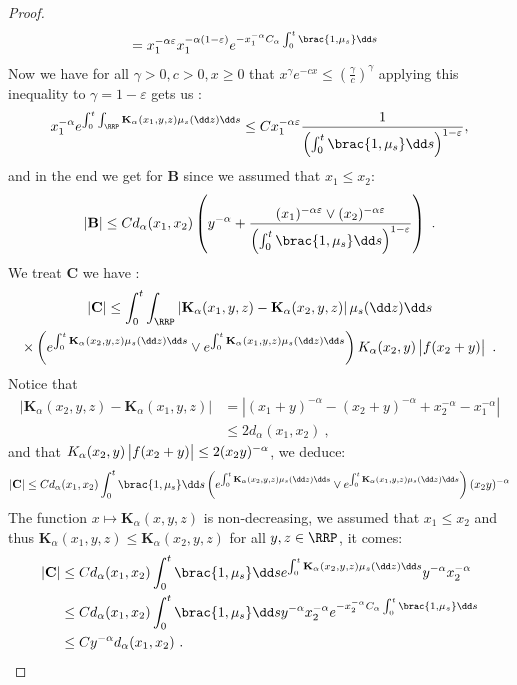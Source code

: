 \begin{proof}
\begin{align*}
        &=x_1^{-\alpha \varepsilon} x_1^{-\alpha(1-\varepsilon)}e^{-x_1^{-\alpha}C_\alpha\int_0^t\brac{1,\mu_s} \dd s} 
    \end{align*}
    Now we have for all $\gamma > 0, c> 0,x\geq 0$ that $x^{\gamma}e^{-cx} \leq \left(\frac{\gamma}{c}\right)^\gamma$ applying this inequality to $\gamma = 1 - \varepsilon $ gets us :
    \begin{align*}
        x_1^{-\alpha}e^{\int_0^t\int_{\RRP} \mathbf{K}_\alpha(x_1,y,z)\mu_s(\dd z) \dd s}   \leq C x_1^{-\alpha \varepsilon} \dfrac{1}{\left(\int_0^t\brac{1,\mu_s} \dd s\right)^{1 - \varepsilon}},
    \end{align*}
    and in the end we get for $\mathbf{B}$ since we assumed that $x_1 \leq x_2$:
    \begin{align*}
        |\mathbf{B}| \leq C d_\alpha(x_1,x_2) \left(y^{-\alpha} + \dfrac{(x_1)^{-\alpha \varepsilon} \vee (x_2)^{-\alpha \varepsilon}}{\left(\int_0^t\brac{1,\mu_s} \dd s\right)^{1 - \varepsilon}} \right)\ .
    \end{align*}
    We treat $\mathbf{C}$ we have :
    \begin{multline*}
        |\mathbf{C}|\leq \int_0^t\int_{\RRP} \left|\mathbf{K}_\alpha(x_1,y,z) - \mathbf{K}_\alpha(x_2,y,z) \right| \mu_s(\dd z) \dd s \\
        \times \left(e^{\int_0^t \mathbf{K}_\alpha(x_2,y,z) \mu_s(\dd z) \dd s} \vee e^{\int_0^t \mathbf{K}_\alpha(x_1,y,z) \mu_s(\dd z) \dd s}\right)K_\alpha(x_2,y)\left|\vphantom{A^2} f(x_2+y)\right|\ .
    \end{multline*}
    Notice that 
    \begin{align*}
        \left|\mathbf{K}_\alpha(x_2,y,z) - \mathbf{K}_\alpha(x_1,y,z)\right| &= \left|(x_1 + y)^{-\alpha} -  (x_2 + y)^{-\alpha} + x_2^{-\alpha} -x_1^{-\alpha}\right|\\
        &\leq 2d_\alpha(x_1,x_2)\ ,
    \end{align*}
    and that $K_\alpha(x_2,y)\left|\vphantom{A^2} f(x_2+y)\right|\leq 2(x_2y)^{-\alpha}$, we deduce:
    \begin{align*}
        |\mathbf{C}|\leq C d_\alpha(x_1,x_2)\int_0^t \brac{1,\mu_s} \dd s \left(e^{\int_0^t \mathbf{K}_\alpha(x_2,y,z) \mu_s(\dd z) \dd s} \vee e^{\int_0^t \mathbf{K}_\alpha(x_1,y,z) \mu_s(\dd z) \dd s}\right)(x_2y)^{-\alpha}
    \end{align*}
    The function $x\mapsto \mathbf{K}_\alpha(x,y,z)$ is non-decreasing, we assumed that $x_1 \leq  x_2$ and thus $\mathbf{K}_\alpha(x_1,y,z) \leq\mathbf{K}_\alpha(x_2,y,z) $  for all $y,z \in \RRP$, it comes:
    \begin{align*}
        |\mathbf{C}| &\leq C d_\alpha(x_1,x_2) \int_0^t \brac{1,\mu_s} \dd s e^{\int_0^t \mathbf{K}_\alpha(x_2,y,z) \mu_s(\dd z) \dd s}y^{-\alpha} x_2^{-\alpha} \\
        &\leq C d_\alpha(x_1,x_2)\int_0^t \brac{1,\mu_s} \dd sy^{-\alpha} x_2^{-\alpha}e^{-x_2^{-\alpha}C_\alpha\int_0^t \brac{1,\mu_s} \dd s}\\
        &\leq Cy^{-\alpha} d_\alpha(x_1,x_2)\ .
    \end{align*}
    

\end{proof}
